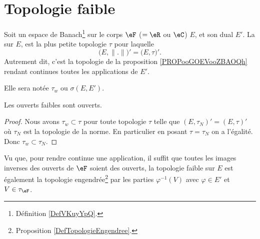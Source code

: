 


\section{Topologie faible}

\begin{definition}        \label{DEFooZGLDooRRarRj}
	Soit un espace de Banach\footnote{Définition \ref{DefVKuyYpQ}.} sur le corps \( \eF\) (\( =\eR\) ou \( \eC\)) \( E\), et son dual \( E'\). La  sur \( E\), est la plus petite topologie \( \tau\) pour laquelle
	\begin{equation}
		\big( E,\| . \| \big)'=\big( E,\tau \big)'.
	\end{equation}
	Autrement dit, c'est la topologie de la proposition \ref{PROPooGOEVooZBAOQh} rendant continues toutes les applications de \( E'\).

	Elle sera notée \( \tau_w\) ou \( \sigma(E,E')\).
\end{definition}

\begin{lemma}	\label{LEMooZPJNooJyaeAC}
	Les ouverts faibles sont ouverts.
\end{lemma}

\begin{proof}
	Nous avons \( \tau_w\subset \tau\) pour toute topologie \( \tau \) telle que \( (E,\tau_N)'=(E,\tau)'\) où \( \tau_N\) est la topologie de la norme. En particulier en posant \( \tau=\tau_N\) on a l'égalité. Donc \( \tau_w\subset\tau_N\).
\end{proof}

Vu que, pour rendre continue une application, il suffit que toutes les images inverses des ouverts de \( \eF\) soient des ouverts, la topologie faible sur \( E\) est également la topologie engendrée\footnote{Proposition \ref{DefTopologieEngendree}.} par les parties \( \varphi^{-1}(V)\) avec \( \varphi\in E'\) et \( V\in \tau_{\eF}\).

